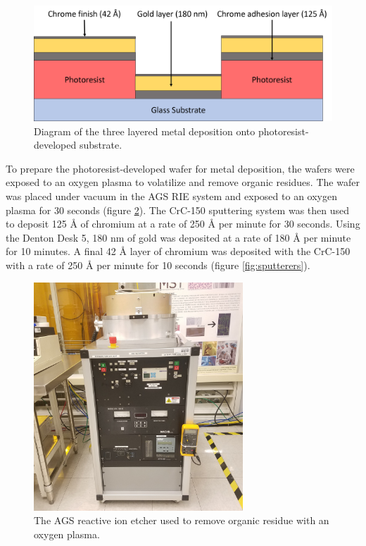 \begin{figure}[h]
    \centering
    \includegraphics[width=\textwidth]{images/metal_deposition_diagram.png}
    \caption[Diagram of metal deposition onto photoresist-developed substrate]{Diagram of the three layered metal deposition onto photoresist-developed substrate.}
    \label{fig:metal_deposition}
\end{figure}

\par To prepare the photoresist-developed wafer for metal deposition, the wafers were exposed to an oxygen plasma to volatilize and remove organic residues. The wafer was placed under vacuum in the AGS RIE system and exposed to an oxygen plasma for 30 seconds (figure \ref{fig:AGS-RIE}). The CrC-150 sputtering system was then used to deposit 125 \si{\angstrom} of chromium at a rate of 250 \si{\angstrom} per minute for 30 seconds. Using the Denton Desk 5, 180 nm of gold was deposited at a rate of 180 \si{\angstrom} per minute for 10 minutes. A final 42 \si{\angstrom} layer of chromium was deposited with the CrC-150 with a rate of 250 \si{\angstrom} per minute for 10 seconds (figure \ref{fig:sputterers}). 

\begin{figure}
    \centering
    \includegraphics[width=0.7\textwidth]{images/AGS_RIE.jpg}
    \caption[AGS reactive ion etcher]{The AGS reactive ion etcher used to remove organic residue with an oxygen plasma.}
    \label{fig:AGS-RIE}
\end{figure}

